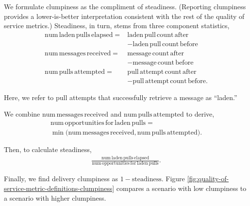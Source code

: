 We formulate clumpiness as the compliment of steadiness.
(Reporting clumpiness provides a lower-is-better interpretation consistent with the rest of the quality of service metrics.)
Steadiness, in turn, stems from three component statistics,
\begin{align*}
\mathrm{num\,laden\,pulls\,elapsed} =& \mathrm{laden\,pull\,count\,after} \\
  &- \mathrm{laden\,pull\,count\,before} \\
\mathrm{num\,messages\,received} =& \mathrm{message\,count\,after} \\
  &- \mathrm{message\,count\,before} \\
\mathrm{num\,pulls\,attempted} =& \mathrm{pull\,attempt\,count\,after} \\
  &- \mathrm{pull\,attempt\,count\,before}
.
\end{align*}

Here, we refer to pull attempts that successfully retrieve a message as ``laden.''

We combine $\mathrm{num\,messages\,received}$ and $\mathrm{num\,pulls\,attempted}$ to derive,
\begin{align*}
  \mathrm{num\,opportunities\,for\,laden\,pulls} = \\
   \min\Big(\mathrm{num\,messages\,received}, \mathrm{num\,pulls\,attempted}\Big).
\end{align*}

Then, to calculate steadiness,
\begin{align*}
  \frac{
    \mathrm{num\,laden\,pulls\,elapsed}
  }{
    \mathrm{num\,opportunities\,for\,laden\,pulls}
  }.
\end{align*}

Finally, we find delivery clumpiness as $1 - \mathrm{steadiness}$.
Figure \ref{fig:quality-of-service-metric-definitions-clumpiness} compares a scenario with low clumpiness to a scenario with higher clumpiness.
